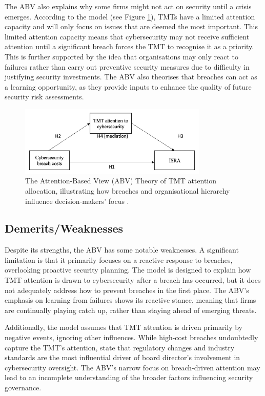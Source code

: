     The ABV also explains why some firms might not act on security until a crisis emerges. According to the model (see Figure \ref{fig:ABV}), TMTs have a limited attention capacity and will only focus on issues that are deemed the most important. This limited attention capacity means that cybersecurity may not receive sufficient attention until a significant breach forces the TMT to recognise it as a priority. This is further supported by the idea that organisations may only react to failures rather than carry out preventive security measures due to difficulty in justifying security investments. The ABV also theorises that breaches can act as a learning opportunity, as they provide inputs to enhance the quality of future security risk assessments.

    \begin{figure}[htbp]
        \centering
        \includegraphics[width=0.8\textwidth]{figures/ABV-Theory.png}
        \caption{The Attention-Based View (ABV) Theory of TMT attention allocation, illustrating how breaches and organisational hierarchy influence decision-makers' focus \citep{shaikh2023information}.}
        \label{fig:ABV}
    \end{figure}

    \subsection{Demerits/Weaknesses}
    Despite its strengths, the ABV has some notable weaknesses. A significant limitation is that it primarily focuses on a reactive response to breaches, overlooking proactive security planning. The model is designed to explain how TMT attention is drawn to cybersecurity after a breach has occurred, but it does not adequately address how to prevent breaches in the first place. The ABV's emphasis on learning from failures shows its reactive stance, meaning that firms are continually playing catch up, rather than staying ahead of emerging threats.

    Additionally, the model assumes that TMT attention is driven primarily by negative events, ignoring other influences. While high-cost breaches undoubtedly capture the TMT's attention, \citet{gale2022governing} state that regulatory changes and industry standards are the most influential driver of board director's involvement in cybersecurity oversight. The ABV's narrow focus on breach-driven attention may lead to an incomplete understanding of the broader factors influencing security governance.

